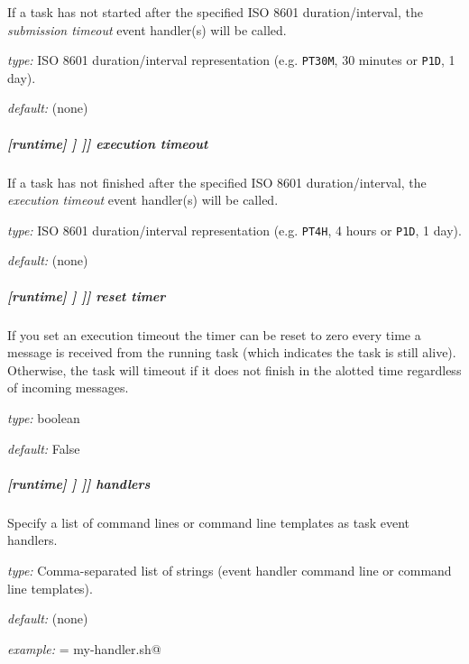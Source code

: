 If a task has not started after the specified ISO 8601 duration/interval, the
{\em submission timeout} event handler(s) will be called.
\begin{myitemize}
    \item {\em type:} ISO 8601 duration/interval representation (e.g.
 \lstinline=PT30M=, 30 minutes or \lstinline=P1D=, 1 day).
    \item {\em default:} (none)
\end{myitemize}

\subparagraph[execution timeout]{[runtime] \textrightarrow [[\_\_NAME\_\_]] \textrightarrow [[[events]]] \textrightarrow execution timeout}
\label{runtime-event-hooks-execution-timeout}

If a task has not finished after the specified ISO 8601 duration/interval, the
{\em execution timeout} event handler(s) will be called.
\begin{myitemize}
    \item {\em type:} ISO 8601 duration/interval representation (e.g.
 \lstinline=PT4H=, 4 hours or \lstinline=P1D=, 1 day).
    \item {\em default:} (none)
\end{myitemize}

\subparagraph[reset timer]{[runtime] \textrightarrow [[\_\_NAME\_\_]] \textrightarrow [[[events]]] \textrightarrow reset timer}
\label{runtime-event-hooks-reset-timer}

If you set an execution timeout the timer can be reset to zero every
time a message is received from the running task (which indicates the
task is still alive).  Otherwise, the task will timeout if it does not
finish in the alotted time regardless of incoming messages.

\begin{myitemize}
\item {\em type:} boolean
\item {\em default:} False
\end{myitemize}

\subparagraph[handlers]{[runtime] \textrightarrow [[\_\_NAME\_\_]] \textrightarrow [[[events]]] \textrightarrow handlers}

Specify a list of command lines or command line templates as task event handlers.

\begin{myitemize}
    \item {\em type:} Comma-separated list of strings (event handler command line or command line templates).
    \item {\em default:} (none)
    \item {\em example:} \lstinline@handlers = my-handler.sh@
\end{myitemize}

